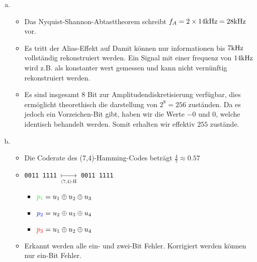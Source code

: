 \begin{enumerate}[a)]
	\item  
	
	\begin{itemize}
		\item Das Nyquist-Shannon-Abtasttheorem schreibt $f_A = 2 \times 14\text{kHz} = 28\text{kHz}$ vor.
		
		\item Es tritt der Alias-Effekt auf Damit können nur informationen bis $7\text{kHz}$ vollständig rekonstruiert werden. Ein Signal mit einer frequenz von $14\text{kHz}$ wird z.B. als konstanter wert gemessen und kann nicht vernünftig rekonstruiert werden.
		
		\item Es sind insgesamt 8 Bit zur Amplitudendiskretisierung verfügbar, dies ermöglicht theorethisch die darstellung von $2^8 = 256$ zuständen. Da es jedoch ein Vorzeichen-Bit gibt, haben wir die Werte $-0$ und $0$, welche identisch behandelt werden. Somit erhalten wir effektiv $255$ zustände.
	\end{itemize}

	\item
	
	\begin{itemize}
		\item Die Coderate des (7,4)-Hamming-Codes beträgt $\frac{4}{7} \approx 0.57$
			
		\item \texttt{0011 1111} $\underset{\text{(7,4)-H}}{\longmapsto}$ \texttt{0011 1111}
		
		\begin{itemize}
			\item $\textcolor{green}{p_1} = u_1 \oplus u_2 \oplus u_3$
			\item $\textcolor{blue}{p_2} = u_2 \oplus u_3 \oplus u_4$
			\item $\textcolor{red}{p_3} = u_1 \oplus u_2 \oplus u_4$
		\end{itemize}		
		
		\item Erkannt werden alle ein- und zwei-Bit Fehler. Korrigiert werden können nur ein-Bit Fehler.
	\end{itemize}
		
\end{enumerate}



